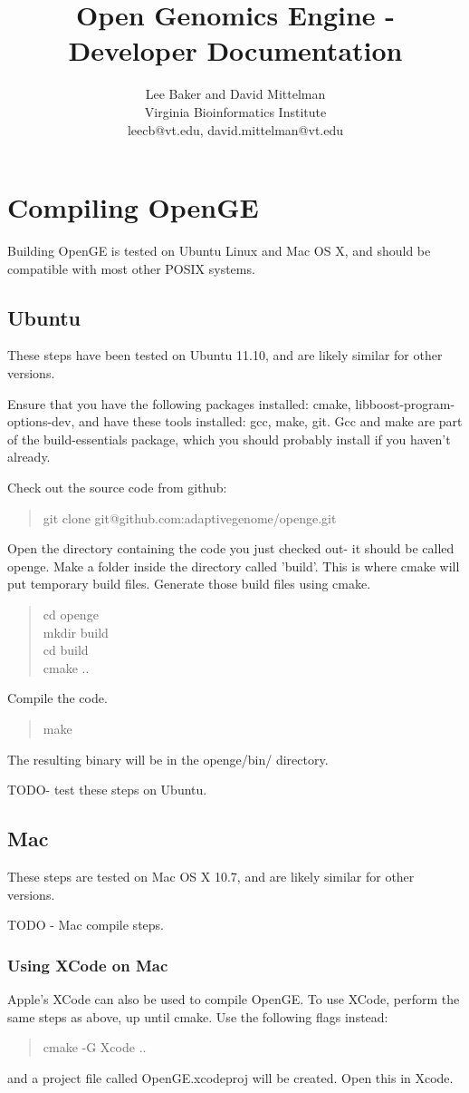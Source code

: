 \documentclass[11pt]{article}
\newcommand {\cmd}[1] {\begin{quote}#1\end{quote}}
\begin{document}
\title{Open Genomics Engine - Developer Documentation}
\author{Lee Baker and David Mittelman\\
Virginia Bioinformatics Institute \\
leecb@vt.edu, david.mittelman@vt.edu}
\maketitle

\section {Compiling OpenGE}
Building OpenGE is tested on Ubuntu Linux and Mac OS X, and should be compatible with most other POSIX systems.

\subsection{Ubuntu}
These steps have been tested on Ubuntu 11.10, and are likely similar for other versions.

Ensure that you have the following packages installed: cmake, libboost-program-options-dev, and have these tools installed: gcc, make, git. Gcc and make are part of the build-essentials package, which you should probably install if you haven't already.

Check out the source code from github:
\cmd{git clone git@github.com:adaptivegenome/openge.git}

Open the directory containing the code you just checked out- it should be called openge. Make a folder inside the directory called 'build'. This is where cmake will put temporary build files. Generate those build files using cmake.
\cmd{cd openge\\mkdir build\\cd build\\cmake ..}

Compile the code.
\cmd{make}
The resulting binary will be in the openge/bin/ directory.

TODO- test these steps on Ubuntu.

\subsection{Mac}
These steps are tested on Mac OS X 10.7, and are likely similar for other versions.

TODO - Mac compile steps.

\subsubsection{Using XCode on Mac}
Apple's XCode can also be used to compile OpenGE. To use XCode, perform the same steps as above, up until cmake. Use the following flags instead:
\cmd{cmake -G Xcode ..}
and a project file called OpenGE.xcodeproj will be created. Open this in Xcode.
\end{document}
